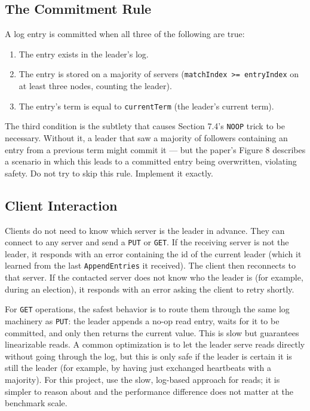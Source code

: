 \documentclass[11pt,a4paper]{article}
\begin{document}
\subsection{The Commitment Rule}
A log entry is committed when all three of the following are true:

\begin{enumerate}
\item The entry exists in the leader's log.
\item The entry is stored on a majority of servers (\texttt{matchIndex >= entryIndex} on at least three nodes, counting the leader).
\item The entry's term is equal to \texttt{currentTerm} (the leader's current term).
\end{enumerate}

The third condition is the subtlety that causes Section 7.4's \texttt{NOOP} trick to be necessary. Without it, a leader that saw a majority of followers containing an entry from a previous term might commit it --- but the paper's Figure 8 describes a scenario in which this leads to a committed entry being overwritten, violating safety. Do not try to skip this rule. Implement it exactly.

\subsection{Client Interaction}
Clients do not need to know which server is the leader in advance. They can connect to any server and send a \texttt{PUT} or \texttt{GET}. If the receiving server is not the leader, it responds with an error containing the id of the current leader (which it learned from the last \texttt{AppendEntries} it received). The client then reconnects to that server. If the contacted server does not know who the leader is (for example, during an election), it responds with an error asking the client to retry shortly.

For \texttt{GET} operations, the safest behavior is to route them through the same log machinery as \texttt{PUT}: the leader appends a no-op read entry, waits for it to be committed, and only then returns the current value. This is slow but guarantees linearizable reads. A common optimization is to let the leader serve reads directly without going through the log, but this is only safe if the leader is certain it is still the leader (for example, by having just exchanged heartbeats with a majority). For this project, use the slow, log-based approach for reads; it is simpler to reason about and the performance difference does not matter at the benchmark scale.
\end{document}
